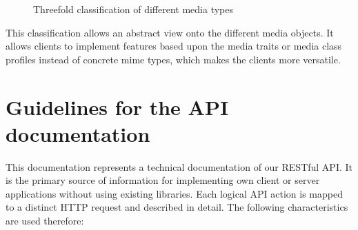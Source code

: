 \documentclass[10pt]{article}
\begin{document}
\begin{figure}[!ht]
\begin{center}
\caption{Threefold classification of different media types}
\label{medtypes}
\end{center}
\end{figure}

This classification allows an abstract view onto the different media objects. It allows clients to implement features based upon the media traits or media class profiles instead of concrete mime types, which makes the clients more versatile.



\section{Guidelines for the API documentation}
\label{sec:app_api_intro}

This documentation represents a technical documentation of our RESTful API. It is the primary source of information for implementing own client or server applications without using existing libraries. Each logical API action is mapped to a distinct HTTP request and described in detail. The following characteristics are used therefore:
\end{document}
